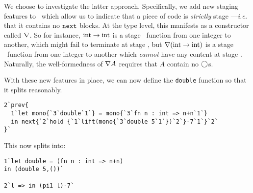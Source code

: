 \begin{concretesyntax}
We choose to investigate the latter approach.
Specifically, we add new staging features to \lang\ which allow us to indicate that a piece of code is {\em strictly} 
stage \bbone---{\em i.e.} that it contains no ${\tt next}$ blocks.
At the type level, this manifests as a constructor called $\nabla$.
So for instance, ${\rm int} \to {\rm int}$ is a stage \bbone\ function from one integer to another,
which might fail to terminate at stage \bbtwo, 
but $\nabla ({\rm int} \to {\rm int})$ is a stage \bbone\ function from one integer to another
which {\em cannot} have any content at stage \bbtwo.
Naturally, the well-formedness of $\nabla A$ requires that $A$ contain no $\bigcirc$s.


With these new features in place, we can now define the \texttt{double}
function so that it splits reasonably.
\begin{lstlisting}
2`prev{
  1`let mono{`3`double`1`} = mono{`3`fn n : int => n+n`1`}
  in next{`2`hold {`1`lift(mono{`3`double 5`1`})`2`}-7`1`}`2`
}`
\end{lstlisting}
This now splits into:
\begin{lstlisting}
1`let double = (fn n : int => n+n)
in (double 5,())`

2`l => in (pi1 l)-7`
\end{lstlisting}
\end{concretesyntax}

